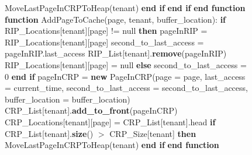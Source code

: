 \begin{figure}[htbp]
\begin{minipage}{\linewidth}
\begin{algorithm}[H]
\begin{algorithmic}
            \STATE \hspace{\algorithmicindent} \hspace{\algorithmicindent} \hspace{\algorithmicindent} MoveLastPageInCRPToHeap(tenant)
            \STATE \hspace{\algorithmicindent} \hspace{\algorithmicindent} \textbf{end if}
            \STATE \hspace{\algorithmicindent} \textbf{end if}
            \STATE \textbf{end function}
            \STATE
            \STATE \textbf{function} AddPageToCache(page, tenant, buffer\_location):
            \STATE \hspace{\algorithmicindent} \textbf{if} RIP\_Locations[tenant][page] != null \textbf{then}
            \STATE \hspace{\algorithmicindent} \hspace{\algorithmicindent} pageInRIP = RIP\_Locations[tenant][page]
            \STATE \hspace{\algorithmicindent} \hspace{\algorithmicindent} second\_to\_last\_access = pageInRIP.last\_access
            \STATE \hspace{\algorithmicindent} \hspace{\algorithmicindent} RIP\_List[tenant].\textbf{remove}(pageInRIP)
            \STATE \hspace{\algorithmicindent} \hspace{\algorithmicindent} RIP\_Locations[tenant][page] = null
            \STATE \hspace{\algorithmicindent} \textbf{else}
            \STATE \hspace{\algorithmicindent} \hspace{\algorithmicindent} second\_to\_last\_access = 0
            \STATE \hspace{\algorithmicindent} \textbf{end if}
            \STATE \hspace{\algorithmicindent} pageInCRP = \textbf{new} PageInCRP(page = page, last\_access = current\_time, second\_to\_last\_access = second\_to\_last\_access, buffer\_location = buffer\_location)
            \STATE \hspace{\algorithmicindent} CRP\_List[tenant].\textbf{add\_to\_front}(pageInCRP)
            \STATE \hspace{\algorithmicindent} CRP\_Locations[tenant][page] = CRP\_List[tenant].head
            \STATE \hspace{\algorithmicindent} \textbf{if} CRP\_List[tenant].\textbf{size}() $>$ CRP\_Size[tenant] \textbf{then}
            \STATE \hspace{\algorithmicindent} \hspace{\algorithmicindent} MoveLastPageInCRPToHeap(tenant)
            \STATE \hspace{\algorithmicindent} \textbf{end if} 
            \STATE \textbf{end function}


\end{algorithmic}
\end{algorithm}
\end{minipage}
\end{figure}
